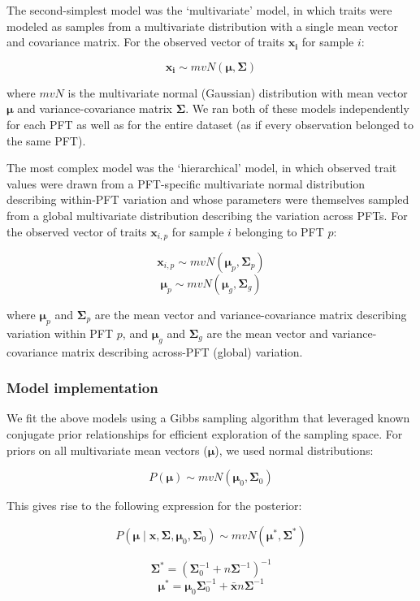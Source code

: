 The second-simplest model was the `multivariate' model, in which traits were modeled as samples from a multivariate distribution with a single mean vector and covariance matrix.
For the observed vector of traits ${\mathbf{x_i}}$ for sample $i$:

\[\mathbf{x_i} \sim mvN(\mathbf{\mu}, \mathbf{\Sigma})\]

where $mvN$ is the multivariate normal (Gaussian) distribution with mean vector $\mathbf{\mu}$ and variance-covariance matrix $\mathbf{\Sigma}$.
We ran both of these models independently for each PFT as well as for the entire dataset (as if every observation belonged to the same PFT).

The most complex model was the `hierarchical' model, in which observed trait values were drawn from a PFT-specific multivariate normal distribution describing within-PFT variation and whose parameters were themselves sampled from a global multivariate distribution describing the variation across PFTs.
For the observed vector of traits $\mathbf{x}_{i,p}$ for sample $i$ belonging to PFT $p$:

\[\mathbf{x}_{i,p} \sim mvN(\mathbf{\mu}_p, \mathbf{\Sigma}_p)\]
\[\mathbf{\mu}_p \sim mvN(\mathbf{\mu}_g, \mathbf{\Sigma}_g)\]

where $\mathbf{\mu}_p$ and $\mathbf{\Sigma}_p$ are the mean vector and variance-covariance matrix describing variation within PFT $p$, and $\mathbf{\mu}_g$ and $\mathbf{\Sigma}_g$ are the mean vector and variance-covariance matrix describing across-PFT (global) variation.


\subsubsection{Model implementation}

We fit the above models using a Gibbs sampling algorithm that leveraged known conjugate prior relationships for efficient exploration of the sampling space.
For priors on all multivariate mean vectors ($\mathbf{\mu}$), we used normal distributions:

\[P(\mathbf{\mu}) \sim mvN(\mathbf{\mu}_0, {\mathbf{\Sigma}}_0)\]

This gives rise to the following expression for the posterior:

\[P(\mathbf{\mu} \mid 
    \mathbf{x}, \mathbf{\Sigma}, 
    \mathbf{\mu}_0, \mathbf{\Sigma}_0)
  \sim
  mvN(\mathbf{\mu^*}, \mathbf{\Sigma^*})\]

\[\mathbf{\Sigma^*} = {(\mathbf{\Sigma}_0^{-1} + n \mathbf{\Sigma}^{-1})}^{-1}\]
\[\mathbf{\mu^*} = \mathbf{\mu}_0 \mathbf{\Sigma}_0^{-1} + \bar{\mathbf{x}} n \mathbf{\Sigma}^{-1}\]


